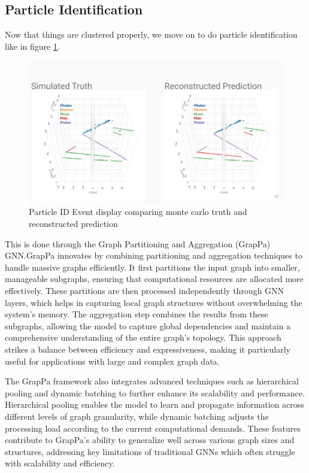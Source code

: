 \subsection{Particle Identification}

Now that things are clustered properly, we move on to do particle identification like in figure \ref{pidEvent}.

\begin{figure}[H]
  \centering
  \includegraphics[width=120mm]{figures/pidEvent.png}
  \caption{Particle ID Event display comparing monte carlo truth and reconstructed prediction}
  \label{pidEvent}
\end{figure}

This is done through the Graph Partitioning and Aggregation (GrapPa) GNN.GrapPa innovates by combining partitioning and aggregation techniques to handle massive graphs efficiently.
It first partitions the input graph into smaller, manageable subgraphs, ensuring that computational resources are allocated more effectively.
These partitions are then processed independently through GNN layers, which helps in capturing local graph structures without overwhelming the system's memory.
The aggregation step combines the results from these subgraphs, allowing the model to capture global dependencies and maintain a comprehensive understanding of the entire graph's topology.
This approach strikes a balance between efficiency and expressiveness, making it particularly useful for applications with large and complex graph data.

The GrapPa framework also integrates advanced techniques such as hierarchical pooling and dynamic batching to further enhance its scalability and performance.
Hierarchical pooling enables the model to learn and propagate information across different levels of graph granularity, while dynamic batching adjusts the processing load according to the current computational demands.
These features contribute to GrapPa's ability to generalize well across various graph sizes and structures, addressing key limitations of traditional GNNs which often struggle with scalability and efficiency.

